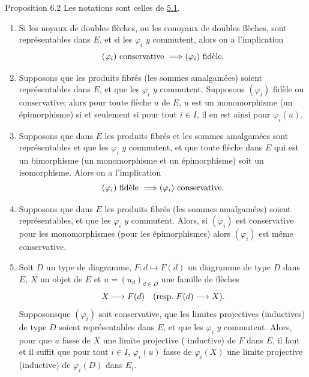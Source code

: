 \documentclass[10pt]{../fichiers-configuration-latex/smfart}
\def\labelenumi{(\theenumi)}
\begin{document}
\begin{enonce*}{Proposition 6.2}
Les notations sont celles de \hyperref[I.prop5.1]{5.1}.
\begin{enumerate}
\renewcommand{\theenumi}{\roman{enumi}}
\renewcommand{\labelenumi}{(\theenumi)}
\item Si les noyaux de doubles flèches, ou les conoyaux de doubles
  flèches, sont représentables dans $E$, et si les $\varphi_i$ $y$
  commutent, alors on a l'implication
$$
(\varphi_i)\mbox{ conservative } \Longrightarrow (\varphi_i)\mbox{
    fidèle}{}.
$$

\item Supposons que les produits fibrés (\resp  les sommes
  amalgamées) soient représentables dans $E$, et que les
  $\varphi_i$ $y$ commutent. Supposons $(\varphi_i)$ fidèle ou
  conservative; alors pour toute flèche $u$ de $E$, $u$ est un
  monomorphisme (\resp  un épimorphisme) si et seulement si pour tout
  $i\in I$, il en est ainsi pour $\varphi_i(u)$.

\item Supposons que dans $E$ les produits fibrés et les sommes
  amalgamées sont représentables et que les $\varphi_i$ $y$
  commutent, et que toute flèche dans $E$ qui est un bimorphisme
  (\ie un monomorphisme et un épimorphisme) soit un
  isomorphisme. Alors on a l'implication
$$
(\varphi_i)\mbox{ fidèle } \Longrightarrow (\varphi_i)\mbox{
    conservative}{}.
$$

\item Supposons que dans $E$ les produits fibrés (\resp  les sommes
  amalgamées) soient représentables, et que les $\varphi_i$ $y$
  commutent. Alors, si $(\varphi_i)$ est conservative pour les
  monomorphismes (\resp  pour les épimorphismes) alors $(\varphi_i)$
  est même conservative.

\item Soit $D$ un type de diagramme, $F:d\mapsto F(d)$ un diagramme de
  type $D$ dans $E$, $X$ un objet de $E$ et $u=(u_d)_{d\in D}$ une
  famille de flèches
$$
X\longrightarrow F(d)\quad (\mbox{resp.\kern.3em} F(d)\longrightarrow
X){}.
$$
Supposons\pageoriginale que $(\varphi_i)$ soit conservative, que les
limites projectives (\resp  inductives) de type $D$ soient
représentables dans $E$, et que les $\varphi_i$ $y$ commutent.
Alors, pour que $u$ fasse de $X$ une limite projective (\resp
inductive) de $F$ dans $E$, il faut et il suffit que pour tout $i\in
I$, $\varphi_i(u)$ fasse de $\varphi_i(X)$ une limite projective
(\resp  inductive) de $\varphi_i(D)$ dans $E_i$.
\end{enumerate}
\end{enonce*}
\end{document}
